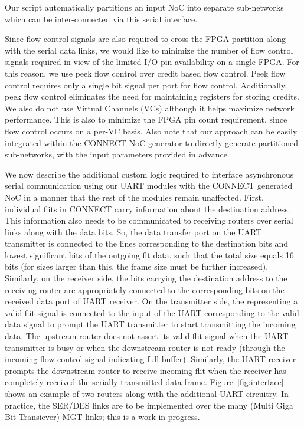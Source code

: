 \documentclass[conference, 9pt]{IEEEtran}
\begin{document}
Our script automatically partitions an input NoC into separate sub-networks which can be inter-connected via this serial interface. 

Since flow control signals are also required to cross the FPGA partition along with the serial data links, we would like to minimize the number of flow control signals required in view of the limited I/O pin availability on a single FPGA. For this reason, we use peek flow control over credit based flow control. Peek flow control requires only a single bit signal per port for flow control. Additionally, peek flow control eliminates the need for maintaining registers for storing credits. We also do not use Virtual Channels (VCs) although it helps maximize network performance. This is also to minimize the FPGA pin count requirement, since flow control occurs on a per-VC basis. Also note that our approach can be easily integrated within the CONNECT NoC generator to directly generate partitioned sub-networks, with the input parameters provided in advance. 
 
 
We now describe the additional custom logic required to interface asynchronous serial communication using our UART modules with the CONNECT generated NoC in a manner that the rest of the modules remain unaffected. First, individual flits in CONNECT carry information about the destination address. This information also needs to be communicated to receiving routers over serial links along with the data bits. So, the data transfer port on the UART transmitter is connected to the lines corresponding to the destination bits and lowest significant bits of the outgoing flt data, such that the total size equals 16 bits (for sizes larger than this, the frame size must be further increased). Similarly, on the receiver side, the bits carrying the destination address to the receiving router are appropriately connected to the corresponding bits on the received data port of UART receiver. On the transmitter side, the representing a valid flit signal is connected to the input of the UART corresponding to the valid data signal to prompt the UART transmitter to start transmitting the incoming data. The upstream router does not assert its valid flit signal when the UART transmitter is busy or when the downstream router is not ready (through the incoming flow control signal indicating full buffer). Similarly, the UART receiver prompts the downstream router to receive incoming flit when the receiver has completely received the serially transmitted data frame. Figure~\ref{fig:interface} shows an example of two routers along with the additional UART circuitry. In practice, the SER/DES links\cite{athavale2005high} are to be implemented over the many (Multi Giga Bit Transiever) MGT links; this is a work in progress.
\end{document}
